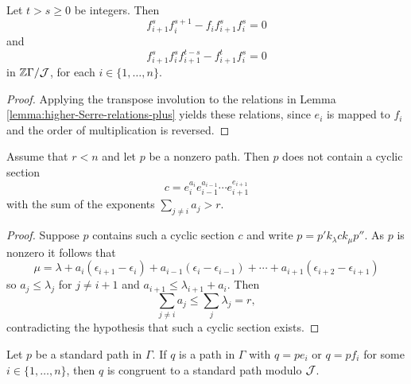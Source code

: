 \documentclass[a4paper, 11pt]{report}
\begin{document}
\begin{corollary}\label{corollary:higher-Serre-relations-minus}
Let $t>s\geq 0$ be integers. Then
\begin{equation*}
f_{i+1}^s f_i^{s+1} - f_i f_{i+1}^s f_i^s = 0
\end{equation*}
and
\begin{equation*}
f_{i+1}^s f_i^s f_{i+1}^{t-s} - f_{i+1}^t f_i^s = 0
\end{equation*}
in $\mathbb{Z}\Gamma/{\mathcal{J}}$, for each $i\in\{1,\ldots,n\}$.
\end{corollary}

\begin{proof}
Applying the transpose involution to the relations in Lemma \ref{lemma:higher-Serre-relations-plus} yields these relations, since $e_i$ is mapped to $f_i$ and the order of multiplication is reversed.
\end{proof}

\begin{lemma}\label{lemma:breaking-the-cycle}
Assume that $r<n$ and let $p$ be a nonzero path. Then $p$ does not contain a cyclic section
\begin{equation*}
c = e_i^{a_i}e_{i-1}^{a_{i-1}}\cdots e_{i+1}^{e_{i+1}}
\end{equation*}
with the sum of the exponents $\sum_{j\neq i} a_j >r$.
\end{lemma}

\begin{proof}
Suppose $p$ contains such a cyclic section $c$ and write $p=p'k_\lambda c k_\mu p''$. As $p$ is nonzero it follows that
\begin{equation*}
\mu = \lambda +a_i(\epsilon_{i+1}-\epsilon_i) +a_{i-1}(\epsilon_i -\epsilon_{i-1})+\cdots +a_{i+1}(\epsilon_{i+2}-\epsilon_{i+1})
\end{equation*}
so $a_j\le \lambda_j$ for $j\neq i+1$ and $a_{i+1}\le\lambda_{i+1} +a_i$. Then
\begin{equation*}
\sum_{j\neq i} a_j \le \sum_{j} \lambda_j = r,
\end{equation*}
contradicting the hypothesis that such a cyclic section exists.
\end{proof}

\begin{lemma}\label{lemma:extending-standard-paths}
Let $p$ be a standard path in $\Gamma$. If $q$ is a path in $\Gamma$ with $q=pe_i$ or $q=pf_i$ for some $i\in\{1,\ldots,n\}$, then $q$ is congruent to a standard path modulo $\mathcal{J}$.
\end{lemma}
\end{document}
